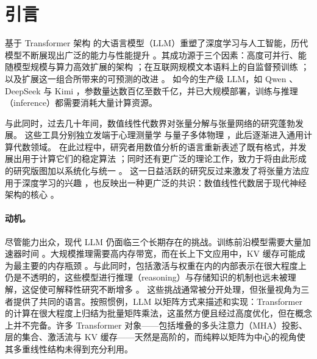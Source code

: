 \section{引言}
\label{sec:introduction}

基于 Transformer 架构 \cite{vaswani2017attention} 的大语言模型（LLM）重塑了深度学习与人工智能，历代模型不断展现出广泛的能力与性能提升 \cite{brown2020gpt3, openai2024gpt4, touvron2023llama}。其成功源于三个因素：高度可并行、能随模型规模与算力高效扩展的架构 \cite{vaswani2017attention}；在互联网规模文本语料上的自监督预训练 \cite{radford2019language, raffel2023t5}；以及扩展这一组合所带来的可预测的改进 \cite{kaplan2020scalinglaws, hoffmann2022scalinglaws2}。
如今的生产级 LLM，如 Qwen \cite{yang2025qwen3}、DeepSeek \cite{deepseekai2026deepseekv4} 与 Kimi \cite{kimiteam2026kimik3}，参数量达数百亿至数千亿，并已大规模部署，训练与推理（inference）都需要消耗大量计算资源。

与此同时，过去几十年间，数值线性代数界对张量分解与张量网络的研究蓬勃发展。
这些工具分别独立发端于心理测量学 \cite{tucker1966some, carroll1970analysis, harshman1970foundations} 与量子多体物理 \cite{orus2014practical, verstraete2008peps, vidal2008mera}，此后逐渐进入通用计算代数领域。
在此过程中，研究者用数值分析的语言重新表述了既有格式，并发展出用于计算它们的稳定算法 \cite{lathauwer2000hosvd, oseledets2011tensor, zhao2016tensorring}；同时还有更广泛的理论工作，致力于将由此形成的研究版图加以系统化与统一 \cite{kolda2009tensor, cichocki2015tensor, cichocki2015tensor2}。
这一日益活跃的研究反过来激发了将张量方法应用于深度学习的兴趣 \cite{wang2025tnmeetnn}，也反映出一种更广泛的共识：数值线性代数居于现代神经架构的核心 \cite{baggag2025linalg}。


\paragraph{动机。}
尽管能力出众，现代 LLM 仍面临三个长期存在的挑战。训练前沿模型需要大量加速器时间 \cite{grattafiori2024llama3}。大规模推理需要高内存带宽，而在长上下文应用中，KV 缓存可能成为最主要的内存瓶颈 \cite{kwon2023paggedattn}。与此同时，包括激活与权重在内的内部表示在很大程度上仍是不透明的，这些模型进行推理（reasoning）与存储知识的机制也远未被理解，这促使可解释性研究不断增多 \cite{elhage2021mathematical, elhage2022superposition}。
这些挑战通常被分开处理，但张量视角为三者提供了共同的语言。按照惯例，LLM 以矩阵方式来描述和实现：Transformer 的计算在很大程度上归结为批量矩阵乘法，这虽然方便且经过高度优化，但在概念上并不完备。许多 Transformer 对象——包括堆叠的多头注意力（MHA）投影、层的集合、激活流与 KV 缓存——天然是高阶的，而纯粹以矩阵为中心的视角使其多重线性结构未得到充分利用。


